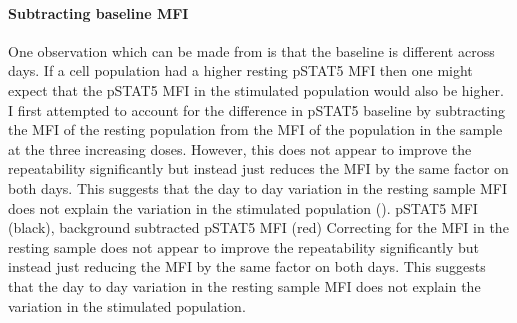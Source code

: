 \paragraph{ Subtracting baseline MFI }
One observation which can be made from  is that the baseline
is different across days.
If a cell population had a higher resting pSTAT5 MFI then one might expect that the pSTAT5 MFI in the stimulated population would also be higher.
I first attempted to account for the difference in pSTAT5 baseline by subtracting the MFI of the resting population from the MFI of
the population in the sample at the three increasing doses.
However, this does not appear to improve the repeatability significantly but instead just reduces the MFI by the same factor on both days.
This suggests that the day to day variation in the resting sample MFI does not explain the variation in the stimulated population
().
{ pSTAT5 MFI (black), background subtracted pSTAT5 MFI (red) }
{
  Correcting for the MFI in the resting sample does not appear to improve the repeatability significantly but instead just reducing the MFI by
  the same factor on both days.
  This suggests that the day to day variation in the resting sample MFI does not explain the variation in the stimulated population.
}


